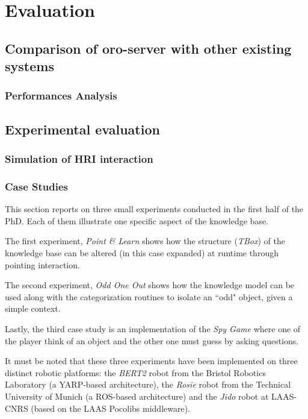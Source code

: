 \chapter{Evaluation}
\label{chapter|evaluation}

\section{Comparison of oro-server with other existing systems}
\label{sect|evaluation-oroserver}

\subsection{Performances Analysis}

\section{Experimental evaluation}
\label{sect|experimental-evaluation}

\subsection{Simulation of HRI interaction}
\label{sect|simulation}

\subsection{Case Studies}
\label{sect|casestudies}

This section reports on three small experiments conducted in the first half of
the PhD. Each of them illustrate one specific aspect of the knowledge base.

The first experiment, \emph{Point \& Learn} shows how the structure
(\emph{TBox}) of the knowledge base can be altered (in this case expanded) at
runtime through pointing interaction.

The second experiment, \emph{Odd One Out} shows how the knowledge model can be
used along with the categorization routines to isolate an ``odd" object, given
a simple context.

Lastly, the third case study is an implementation of the \emph{Spy Game} where
one of the player think of an object and the other one must guess by asking
questions.

It must be noted that these three experiments have been implemented on three
distinct robotic platforms: the \textit{BERT2} robot from the Bristol Robotics
Laboratory (a YARP-based architecture), the \textit{Rosie} robot from the
Technical University of Munich (a ROS-based architecture) and the \textit{Jido}
robot at LAAS-CNRS (based on the LAAS Pocolibs middleware).

